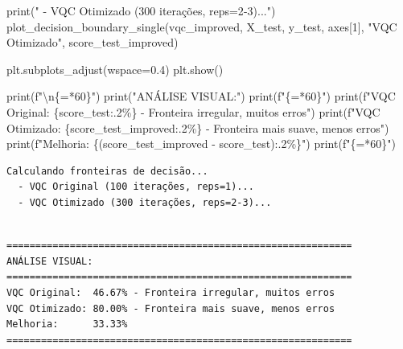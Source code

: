\documentclass[
  brazilian,
]{report}
\newenvironment{Shaded}{\begin{snugshade}}{\end{snugshade}}
\newcommand{\BuiltInTok}[1]{\textcolor[rgb]{0.00,0.23,0.31}{#1}}
\newcommand{\CharTok}[1]{\textcolor[rgb]{0.13,0.47,0.30}{#1}}
\newcommand{\DecValTok}[1]{\textcolor[rgb]{0.68,0.00,0.00}{#1}}
\newcommand{\FloatTok}[1]{\textcolor[rgb]{0.68,0.00,0.00}{#1}}
\newcommand{\NormalTok}[1]{\textcolor[rgb]{0.00,0.23,0.31}{#1}}
\newcommand{\OperatorTok}[1]{\textcolor[rgb]{0.37,0.37,0.37}{#1}}
\newcommand{\SpecialCharTok}[1]{\textcolor[rgb]{0.37,0.37,0.37}{#1}}
\newcommand{\SpecialStringTok}[1]{\textcolor[rgb]{0.13,0.47,0.30}{#1}}
\newcommand{\StringTok}[1]{\textcolor[rgb]{0.13,0.47,0.30}{#1}}
\begin{document}
\begin{tcolorbox}
\begin{Shaded}
\begin{Highlighting}[]
\BuiltInTok{print}\NormalTok{(}\StringTok{"  {-} VQC Otimizado (300 iterações, reps=2{-}3)..."}\NormalTok{)}
\NormalTok{plot\_decision\_boundary\_single(vqc\_improved, X\_test, y\_test, axes[}\DecValTok{1}\NormalTok{], }
                              \StringTok{"VQC Otimizado"}\NormalTok{, score\_test\_improved)}

\NormalTok{plt.subplots\_adjust(wspace}\OperatorTok{=}\FloatTok{0.4}\NormalTok{)}
\NormalTok{plt.show()}

\BuiltInTok{print}\NormalTok{(}\SpecialStringTok{f"}\CharTok{\textbackslash{}n}\SpecialCharTok{\{}\StringTok{\textquotesingle{}=\textquotesingle{}}\OperatorTok{*}\DecValTok{60}\SpecialCharTok{\}}\SpecialStringTok{"}\NormalTok{)}
\BuiltInTok{print}\NormalTok{(}\StringTok{"ANÁLISE VISUAL:"}\NormalTok{)}
\BuiltInTok{print}\NormalTok{(}\SpecialStringTok{f"}\SpecialCharTok{\{}\StringTok{\textquotesingle{}=\textquotesingle{}}\OperatorTok{*}\DecValTok{60}\SpecialCharTok{\}}\SpecialStringTok{"}\NormalTok{)}
\BuiltInTok{print}\NormalTok{(}\SpecialStringTok{f"VQC Original:  }\SpecialCharTok{\{}\NormalTok{score\_test}\SpecialCharTok{:.2\%\}}\SpecialStringTok{ {-} Fronteira irregular, muitos erros"}\NormalTok{)}
\BuiltInTok{print}\NormalTok{(}\SpecialStringTok{f"VQC Otimizado: }\SpecialCharTok{\{}\NormalTok{score\_test\_improved}\SpecialCharTok{:.2\%\}}\SpecialStringTok{ {-} Fronteira mais suave, menos erros"}\NormalTok{)}
\BuiltInTok{print}\NormalTok{(}\SpecialStringTok{f"Melhoria:      }\SpecialCharTok{\{}\NormalTok{(score\_test\_improved }\OperatorTok{{-}}\NormalTok{ score\_test)}\SpecialCharTok{:.2\%\}}\SpecialStringTok{"}\NormalTok{)}
\BuiltInTok{print}\NormalTok{(}\SpecialStringTok{f"}\SpecialCharTok{\{}\StringTok{\textquotesingle{}=\textquotesingle{}}\OperatorTok{*}\DecValTok{60}\SpecialCharTok{\}}\SpecialStringTok{"}\NormalTok{)}
\end{Highlighting}
\end{Shaded}

\end{tcolorbox}

\begin{verbatim}
Calculando fronteiras de decisão...
  - VQC Original (100 iterações, reps=1)...
  - VQC Otimizado (300 iterações, reps=2-3)...
\end{verbatim}

\begin{verbatim}

============================================================
ANÁLISE VISUAL:
============================================================
VQC Original:  46.67% - Fronteira irregular, muitos erros
VQC Otimizado: 80.00% - Fronteira mais suave, menos erros
Melhoria:      33.33%
============================================================
\end{verbatim}
\end{document}
